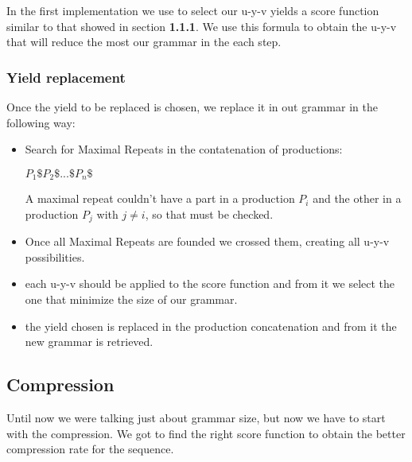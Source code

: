 In the first implementation we use to select our u-y-v yields a score function 
similar to that showed in section \textbf{1.1.1}. 
We use this formula to obtain the u-y-v that will reduce the most our grammar in the 
each step. 

\subsubsection{Yield replacement}

Once the yield to be replaced is chosen, we replace it in out grammar in the following way:
\begin{itemize}
	\item Search for Maximal Repeats in the contatenation of productions:
	\begin{center}
	$P_1 \$ P_2 \$ ... \$ P_n \$$
	\end{center}
	A maximal repeat couldn't have a part in a production $P_i$ and the other in 
	a production $P_j$ with $j \neq i$, so that must be checked.
	\item Once all Maximal Repeats are founded we crossed them, creating all 
	u-y-v possibilities.
	\item each u-y-v should be applied to the score function and from it we select
	the one that minimize the size of our grammar.
	\item the yield chosen is replaced in the production concatenation and from it
 	the new grammar is retrieved.

\end{itemize}

\subsection{Compression}

Until now we were talking just about grammar size, but now we have to start with
the compression. We got to find the right score function to obtain the better
compression rate for the sequence.